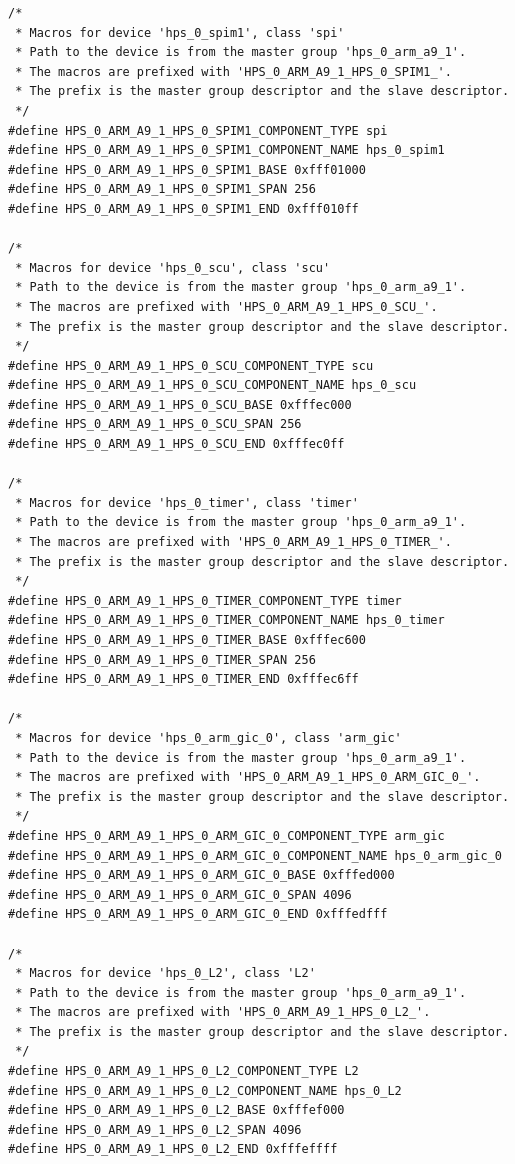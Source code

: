 \documentclass[conference]{IEEEtran}
\begin{document}
\begin{lstlisting}
/*
 * Macros for device 'hps_0_spim1', class 'spi'
 * Path to the device is from the master group 'hps_0_arm_a9_1'.
 * The macros are prefixed with 'HPS_0_ARM_A9_1_HPS_0_SPIM1_'.
 * The prefix is the master group descriptor and the slave descriptor.
 */
#define HPS_0_ARM_A9_1_HPS_0_SPIM1_COMPONENT_TYPE spi
#define HPS_0_ARM_A9_1_HPS_0_SPIM1_COMPONENT_NAME hps_0_spim1
#define HPS_0_ARM_A9_1_HPS_0_SPIM1_BASE 0xfff01000
#define HPS_0_ARM_A9_1_HPS_0_SPIM1_SPAN 256
#define HPS_0_ARM_A9_1_HPS_0_SPIM1_END 0xfff010ff

/*
 * Macros for device 'hps_0_scu', class 'scu'
 * Path to the device is from the master group 'hps_0_arm_a9_1'.
 * The macros are prefixed with 'HPS_0_ARM_A9_1_HPS_0_SCU_'.
 * The prefix is the master group descriptor and the slave descriptor.
 */
#define HPS_0_ARM_A9_1_HPS_0_SCU_COMPONENT_TYPE scu
#define HPS_0_ARM_A9_1_HPS_0_SCU_COMPONENT_NAME hps_0_scu
#define HPS_0_ARM_A9_1_HPS_0_SCU_BASE 0xfffec000
#define HPS_0_ARM_A9_1_HPS_0_SCU_SPAN 256
#define HPS_0_ARM_A9_1_HPS_0_SCU_END 0xfffec0ff

/*
 * Macros for device 'hps_0_timer', class 'timer'
 * Path to the device is from the master group 'hps_0_arm_a9_1'.
 * The macros are prefixed with 'HPS_0_ARM_A9_1_HPS_0_TIMER_'.
 * The prefix is the master group descriptor and the slave descriptor.
 */
#define HPS_0_ARM_A9_1_HPS_0_TIMER_COMPONENT_TYPE timer
#define HPS_0_ARM_A9_1_HPS_0_TIMER_COMPONENT_NAME hps_0_timer
#define HPS_0_ARM_A9_1_HPS_0_TIMER_BASE 0xfffec600
#define HPS_0_ARM_A9_1_HPS_0_TIMER_SPAN 256
#define HPS_0_ARM_A9_1_HPS_0_TIMER_END 0xfffec6ff

/*
 * Macros for device 'hps_0_arm_gic_0', class 'arm_gic'
 * Path to the device is from the master group 'hps_0_arm_a9_1'.
 * The macros are prefixed with 'HPS_0_ARM_A9_1_HPS_0_ARM_GIC_0_'.
 * The prefix is the master group descriptor and the slave descriptor.
 */
#define HPS_0_ARM_A9_1_HPS_0_ARM_GIC_0_COMPONENT_TYPE arm_gic
#define HPS_0_ARM_A9_1_HPS_0_ARM_GIC_0_COMPONENT_NAME hps_0_arm_gic_0
#define HPS_0_ARM_A9_1_HPS_0_ARM_GIC_0_BASE 0xfffed000
#define HPS_0_ARM_A9_1_HPS_0_ARM_GIC_0_SPAN 4096
#define HPS_0_ARM_A9_1_HPS_0_ARM_GIC_0_END 0xfffedfff

/*
 * Macros for device 'hps_0_L2', class 'L2'
 * Path to the device is from the master group 'hps_0_arm_a9_1'.
 * The macros are prefixed with 'HPS_0_ARM_A9_1_HPS_0_L2_'.
 * The prefix is the master group descriptor and the slave descriptor.
 */
#define HPS_0_ARM_A9_1_HPS_0_L2_COMPONENT_TYPE L2
#define HPS_0_ARM_A9_1_HPS_0_L2_COMPONENT_NAME hps_0_L2
#define HPS_0_ARM_A9_1_HPS_0_L2_BASE 0xfffef000
#define HPS_0_ARM_A9_1_HPS_0_L2_SPAN 4096
#define HPS_0_ARM_A9_1_HPS_0_L2_END 0xfffeffff


\end{lstlisting}
\end{document}
